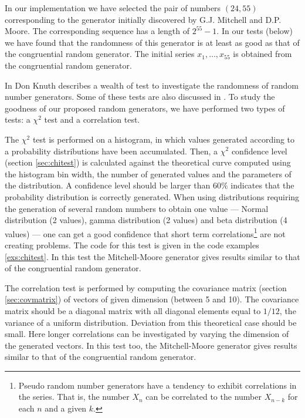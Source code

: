 In our implementation we have selected the pair of numbers
$\left(24,55\right)$ corresponding to the generator initially
discovered by G.J. Mitchell and D.P. Moore\cite{Knuth2}. The
corresponding sequence has a length of $2^{55}-1$. In our tests
(\cf below) we have found that the randomness of this generator is
at least as good as that of the congruential random generator. The
initial series $x_1,\ldots,x_{55}$ is obtained from the
congruential random generator.

In \cite{Knuth2} Don Knuth describes a wealth of test to investigate the randomness of random number generators.
Some of these tests are also discussed in \cite{LawKel}.
To study the goodness of our proposed random generators, we have performed two types of tests: a $\chi^2$ test and a correlation test.

The $\chi^2$ test is performed on a histogram, in which values
generated according to a probability distributions have been
accumulated. Then, a $\chi^2$ confidence level (\cf section
\ref{sec:chitest}) is calculated against the theoretical curve
computed using the histogram bin width, the number of generated
values and the parameters of the distribution. A confidence level
should be larger than $60\%$ indicates that the probability
distribution is correctly generated. When using distributions
requiring the generation of several random numbers to obtain one
value --- Normal distribution (2 values), gamma distribution (2
values) and beta distribution (4 values)
--- one can get a good confidence that short term
correlations\footnote{Pseudo random number generators have a
tendency to exhibit correlations in the series. That is, the
number $X_n$ can be correlated to the number $X_{n-k}$ for each
$n$ and a given $k$.} are not creating problems. The code for this
test is given in the code examples \ref{exs:chitest}. In this test the Mitchell-Moore
generator gives results similar to that of the congruential random
generator.

The correlation test is performed by computing the covariance
matrix (\cf section \ref{sec:covmatrix}) of vectors of given
dimension (between 5 and 10). The covariance matrix should be a
diagonal matrix with all diagonal elements equal to $1/12$, the
variance of a uniform distribution. Deviation from this
theoretical case should be small. Here longer correlations can be
investigated by varying the dimension of the generated vectors. In
this test too, the Mitchell-Moore generator gives results similar
to that of the congruential random generator.

